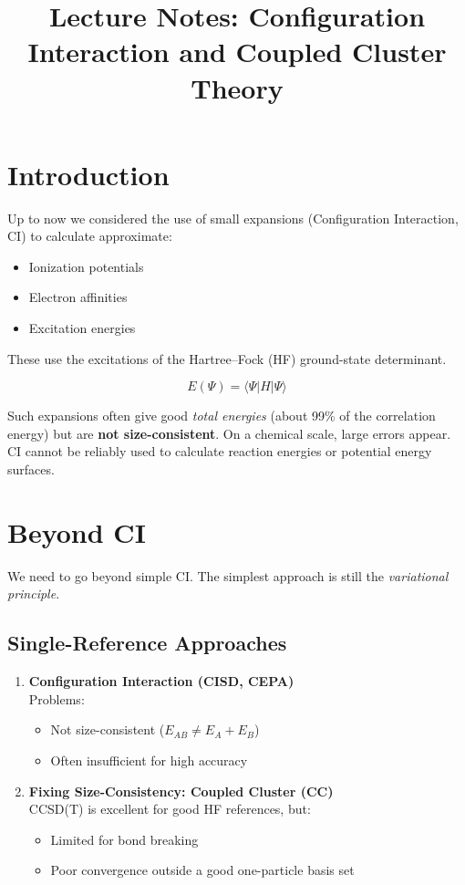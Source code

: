 \documentclass[12pt]{article}
\title{Lecture Notes: Configuration Interaction and Coupled Cluster Theory}
\author{}
\date{}
\begin{document}
\maketitle

\section{Introduction}

Up to now we considered the use of small expansions (Configuration Interaction, CI) to calculate approximate:
\begin{itemize}
    \item Ionization potentials
    \item Electron affinities
    \item Excitation energies
\end{itemize}

These use the excitations of the Hartree--Fock (HF) ground-state determinant.

\[
E(\Psi) = \langle \Psi | H | \Psi \rangle
\]

Such expansions often give good \textit{total energies} (about 99\% of the correlation energy) but are \textbf{not size-consistent}.
On a chemical scale, large errors appear.
CI cannot be reliably used to calculate reaction energies or potential energy surfaces.

\section{Beyond CI}

We need to go beyond simple CI. The simplest approach is still the \textit{variational principle}.

\subsection{Single-Reference Approaches}

\begin{enumerate}
    \item \textbf{Configuration Interaction (CISD, CEPA)} \\
    Problems:
    \begin{itemize}
        \item Not size-consistent (\(E_{AB} \neq E_A + E_B\))
        \item Often insufficient for high accuracy
    \end{itemize}

    \item \textbf{Fixing Size-Consistency: Coupled Cluster (CC)} \\
    CCSD(T) is excellent for good HF references, but:
    \begin{itemize}
        \item Limited for bond breaking
        \item Poor convergence outside a good one-particle basis set
    \end{itemize}
\end{enumerate}
\end{document}
